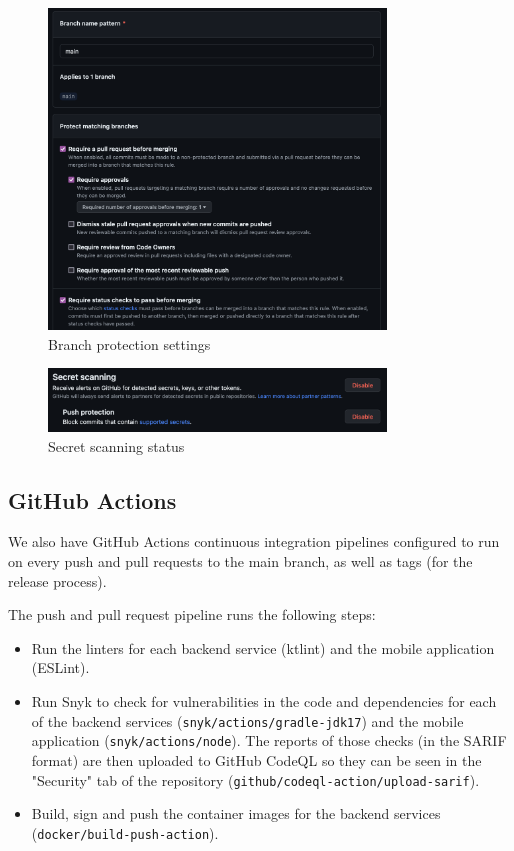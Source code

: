 \documentclass[12pt,x11names]{article}
\begin{document}
\begin{figure}[H]
  \centering
  \includegraphics[width=0.8\textwidth]{imgs/branch_protection.png}
  \caption{Branch protection settings}
\end{figure}

\begin{figure}[H]
  \centering
  \includegraphics[width=0.8\textwidth]{imgs/secret_scanning.png}
  \caption{Secret scanning status}
\end{figure}

\subsection{GitHub Actions}

We also have GitHub Actions continuous integration pipelines configured to run on every
push and pull requests to the main branch, as well as tags (for the release process).

\medskip
The push and pull request pipeline runs the following steps:

\begin{itemize}
    \item Run the linters for each backend service (ktlint) and the mobile 
    application (ESLint).
    \item Run Snyk to check for vulnerabilities in the code and dependencies for each
    of the backend services (\texttt{snyk/actions/gradle-jdk17}) and the mobile application 
    (\texttt{snyk/actions/node}). The reports of those checks (in the SARIF format) are 
    then uploaded to GitHub CodeQL so they can be seen in the "Security" tab of the repository
    (\texttt{github/codeql-action/upload-sarif}).
    \item Build, sign and push the container images for the backend services (\texttt{docker/build-push-action}).
\end{itemize}
\end{document}
